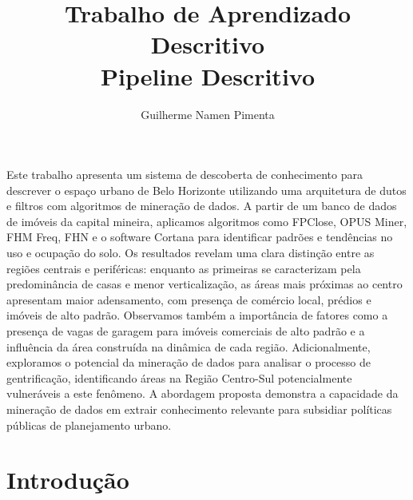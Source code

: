 \documentclass[12pt]{article}
\title{Trabalho de Aprendizado Descritivo\\ Pipeline Descritivo}
\author{Guilherme Namen Pimenta\inst{1} }
\begin{document}
 

\maketitle

  
     
\begin{resumo} 
Este trabalho apresenta um sistema de descoberta de conhecimento para descrever o espaço urbano de Belo Horizonte utilizando uma arquitetura de dutos e filtros com algoritmos de mineração de dados. A partir de um banco de dados de imóveis da capital mineira, aplicamos algoritmos como FPClose, OPUS Miner, FHM Freq, FHN e o software Cortana para identificar padrões e tendências no uso e ocupação do solo. Os resultados revelam uma clara distinção entre as regiões centrais e periféricas: enquanto as primeiras se caracterizam pela predominância de casas e menor verticalização, as áreas mais próximas ao centro apresentam maior adensamento, com presença de comércio local, prédios e imóveis de alto padrão. Observamos também a importância de fatores como a presença de vagas de garagem para imóveis comerciais de alto padrão e a influência da área construída na dinâmica de cada região. Adicionalmente, exploramos o potencial da mineração de dados para analisar o processo de gentrificação, identificando áreas na Região Centro-Sul potencialmente vulneráveis a este fenômeno. A abordagem proposta demonstra a capacidade da mineração de dados em extrair conhecimento relevante para subsidiar políticas públicas de planejamento urbano.
\end{resumo}


\section{Introdução}

\end{document}

